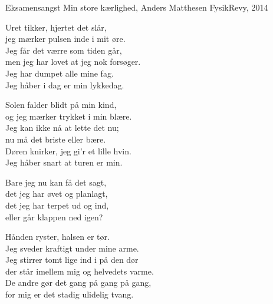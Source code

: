 \begin{song}{Eksamensangst}
  {} %
  {Min store kærlighed, Anders Matthesen} %
  {} %
  {FysikRevy, 2014} %
  {\NotCCLIed} %

  \begin{SBVerse}
    Uret tikker, hjertet det slår,\\
    jeg mærker pulsen inde i mit øre.\\
    Jeg får det værre som tiden går,\\
    men jeg har lovet at jeg nok forsøger.\\
    Jeg har dumpet alle mine fag.\\
    Jeg håber i dag er min lykkedag.
  \end{SBVerse}

  \begin{SBVerse}
    Solen falder blidt på min kind,\\
    og jeg mærker trykket i min blære.\\
    Jeg kan ikke nå at lette det nu;\\
    nu må det briste eller bære.\\
    Døren knirker, jeg gi'r et lille hvin.\\
    Jeg håber snart at turen er min.
  \end{SBVerse}

  \begin{SBChorus}
    Bare jeg nu kan få det sagt,\\
    det jeg har øvet og planlagt,\\
    det jeg har terpet ud og ind,\\
    eller går klappen ned igen?
  \end{SBChorus}

  \begin{SBVerse}
    Hånden ryster, halsen er tør.\\
    Jeg sveder kraftigt under mine arme.\\
    Jeg stirrer tomt lige ind i på den dør\\
    der står imellem mig og helvedets varme.\\
    De andre gør det gang på gang på gang,\\
    for mig er det stadig ulidelig tvang.
  \end{SBVerse}


\end{song}
